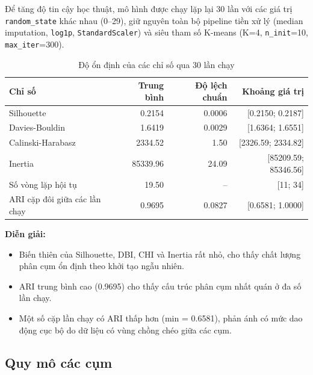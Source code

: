 Để tăng độ tin cậy học thuật, mô hình được chạy lặp lại 30 lần với các giá trị \texttt{random\_state} khác nhau (0--29), giữ nguyên toàn bộ pipeline tiền xử lý (median imputation, \texttt{log1p}, \texttt{StandardScaler}) và siêu tham số K-means (K=4, \texttt{n\_init}=10, \texttt{max\_iter}=300).

\begin{table}[H]
\centering
\caption{Độ ổn định của các chỉ số qua 30 lần chạy}
\begin{tabular}{|l|r|r|r|}
\hline
\textbf{Chỉ số} & \textbf{Trung bình} & \textbf{Độ lệch chuẩn} & \textbf{Khoảng giá trị} \\
\hline
Silhouette & 0.2154 & 0.0006 & [0.2150; 0.2187] \\
\hline
Davies-Bouldin & 1.6419 & 0.0029 & [1.6364; 1.6551] \\
\hline
Calinski-Harabasz & 2334.52 & 1.50 & [2326.59; 2334.82] \\
\hline
Inertia & 85339.96 & 24.09 & [85209.59; 85346.56] \\
\hline
Số vòng lặp hội tụ & 19.50 & -- & [11; 34] \\
\hline
ARI cặp đôi giữa các lần chạy & 0.9695 & 0.0827 & [0.6581; 1.0000] \\
\hline
\end{tabular}
\end{table}

\textbf{Diễn giải:}
\begin{itemize}
    \item Biến thiên của Silhouette, DBI, CHI và Inertia rất nhỏ, cho thấy chất lượng phân cụm ổn định theo khởi tạo ngẫu nhiên.
    \item ARI trung bình cao (0.9695) cho thấy cấu trúc phân cụm nhất quán ở đa số lần chạy.
    \item Một số cặp lần chạy có ARI thấp hơn (min = 0.6581), phản ánh có mức dao động cục bộ do dữ liệu có vùng chồng chéo giữa các cụm.
\end{itemize}

\subsection{Quy mô các cụm}

